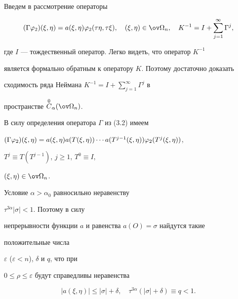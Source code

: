 \begin{pf}


Введем в рассмотрение операторы


\begin{equation}


(\Gamma\varphi_2)(\xi,\eta)=a(\xi,\eta)\varphi_2


(\tau\eta,\tau\xi),\quad (\xi,\eta)\in\ov\Omega_n,\quad


K^{-1}=I+\sum^\infty_{j=1}\Gamma^j,


\end{equation}


где $I$ --- тождественный оператор. Легко видеть, что оператор $K^{-1}$


является формально обратным к оператору $K$. Поэтому достаточно доказать


сходимость ряда Неймана $K^{-1}=I+\sum\limits^\infty_{j=1}\Gamma^j$ в


пространстве $\OC_\alpha(\ov\Omega_n)$.





В силу определения оператора $\Gamma$ из (3.2) имеем


$(\Gamma\varphi_2)(\xi,\eta)=a(\xi,\eta)a(T(\xi,\eta))\dotsb\linebreak


a(T^{j-1}(\xi,\eta))\varphi_2(T^j(\xi,\eta))$,


$T^j\equiv T(T^{j-1})$, $j\ge 1$, $T^0\equiv I$,


$(\xi,\eta)\in\ov\Omega_n$.


Условие $\alpha>\alpha_0$ равносильно неравенству


$\tau^{3\alpha}|\sigma|<1$. Поэтому в силу


непрерывности функции $a$ и равенства $a(O)=\sigma$ найдутся такие


положительные числа


$\varepsilon$ ($\varepsilon<n$), $\delta$ и $q$, что при


$0\le\rho\le\varepsilon$ будут справедливы неравенства


\begin{equation}


|a(\xi,\eta)|\le|\sigma|+\delta,\quad


\tau^{3\alpha}(|\sigma|+\delta)\equiv q<1.


\end{equation}






\end{pf}
